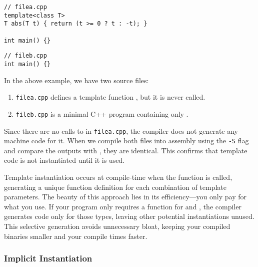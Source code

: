\documentclass[12pt]{article}
\begin{document}
\begin{lstlisting}[style=cxx]
// filea.cpp
template<class T>
T abs(T t) { return (t >= 0 ? t : -t); }

int main() {}
\end{lstlisting}

\begin{lstlisting}[style=cxx]
// fileb.cpp
int main() {}
\end{lstlisting}


\begin{explanation}
\noindent
In the above example, we have two source files:

\begin{enumerate}
    \item \texttt{filea.cpp} defines a template function , but it is never called.
    \item \texttt{fileb.cpp} is a minimal C++ program containing only .
\end{enumerate}

\noindent
Since there are no calls to  in \texttt{filea.cpp}, the compiler does not generate any machine code for it.
When we compile both files into assembly using the \texttt{-S} flag and compare the outputs with , they are identical.
This confirms that template code is not instantiated until it is used.
\end{explanation}

\noindent
Template instantiation occurs at compile-time when the function is called, generating a unique function definition for each combination of template parameters.
The beauty of this approach lies in its efficiency—you only pay for what you use.
If your program only requires a  function for  and , the compiler generates code only for those types, leaving other potential instantiations unused.
This selective generation avoids unnecessary bloat, keeping your compiled binaries smaller and your compile times faster.

\subsubsection{Implicit Instantiation}
\end{document}
